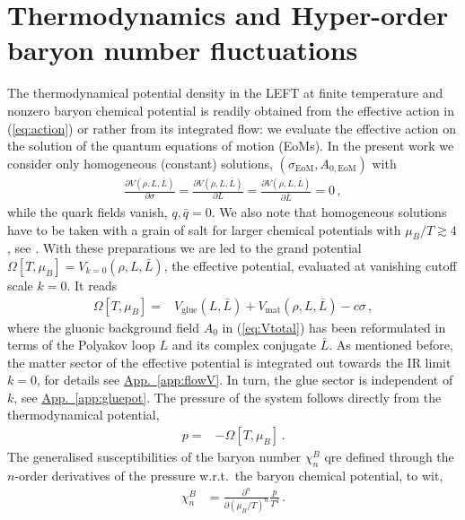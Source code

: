 \documentclass[%
reprint,
superscriptaddress,
showpacs,preprintnumbers,
amsmath,amssymb,
aps,
prd,
]{revtex4-1}
\def\eq#1{(\ref{#1})}
\begin{document}
	
\section{Thermodynamics and Hyper-order baryon number fluctuations}
\label{sec:hyper-fluc}
	

The thermodynamical potential density in the LEFT at finite temperature and nonzero baryon chemical potential is readily obtained from the effective action in \eq{eq:action} or rather from its integrated flow: we evaluate the effective action on the solution of the quantum equations of motion (EoMs). In the present work we consider only homogeneous (constant) solutions,  $(\sigma_\textrm{EoM}, A_{0,\textrm{EoM}})$ with
%
\begin{align}\label{eq:EoMs}
\frac{\partial V(\rho, L,\bar L)}{\partial \sigma} =   \frac{\partial V(\rho, L,\bar L)}{\partial L} = \frac{\partial V(\rho, L,\bar L)}{\partial \bar L} =0\,, 
\end{align}
%
while the quark fields vanish, $q,\bar q=0$. We also note that homogeneous solutions have to be taken with a grain of salt for larger chemical potentials with $\mu_B/T\gtrsim 4$, see \cite{Fu:2019hdw}. With these preparations we are led to the grand potential $\Omega[T,\mu_B]= V_{k=0}(\rho, L,\bar L)$, the effective potential, evaluated at vanishing cutoff scale $k=0$. It reads   
%
\begin{align}
\Omega[T,\mu_B]=&V_{\mathrm{glue}}(L, \bar L)+V_{\mathrm{mat}}(\rho, L, \bar L)-c\sigma\,,\label{eq:Omega}
\end{align}
where the gluonic background field $A_0$ in \eq{eq:Vtotal} has been reformulated in terms of the Polyakov loop $L$ and its complex conjugate $\bar L$. As mentioned before, the matter sector of the effective potential is integrated out towards the IR limit $k=0$, for details see \hyperref[app:flowV]{App.~\ref{app:flowV}}. In turn, the glue sector is independent of $k$, see \hyperref[app:gluepot]{App.~\ref{app:gluepot}}. The pressure of the system follows directly from the thermodynamical potential,
%
\begin{align}
p=&-\Omega[T,\mu_B]\,.\label{eq:pres}
\end{align}
%
The generalised susceptibilities of the baryon number $\chi^B_n$ qre defined through the $n$-order derivatives of the pressure w.r.t.\ the baryon chemical potential, to wit,
%
\begin{align}
\chi_n^{B}&=\frac{\partial^n}{\partial (\mu_B/T)^n}\frac{p}{T^4}\,.\label{eq:suscept}
\end{align}
\end{document}
